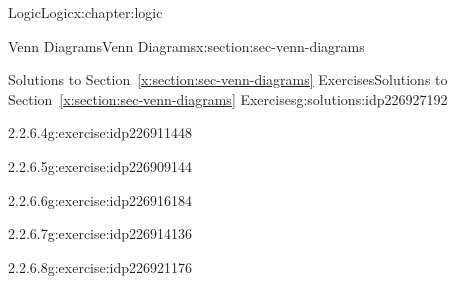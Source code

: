 \documentclass[twoside,10pt,]{book}
\newcommand{\xreffont}{\relax}
\numberwithin{equation}{section}
\begin{document}
\begin{chapterptx}{Logic}{}{Logic}{}{}{x:chapter:logic}
\begin{sectionptx}{Venn Diagrams}{}{Venn Diagrams}{}{}{x:section:sec-venn-diagrams}
\begin{solutions-subsection}{Solutions to Section~{\xreffont\ref*{x:section:sec-venn-diagrams}} Exercises}{}{Solutions to Section~{\xreffont\ref*{x:section:sec-venn-diagrams}} Exercises}{}{}{g:solutions:idp226927192}
\begin{exercisegroup}
\begin{divisionsolutioneg}{2.2.6.4}{}{g:exercise:idp226911448}
\begin{image}{0.3}{0.4}{0.3}
\resizebox{\linewidth}{!}{%
\begin{venndiagram2sets}[labelA={$p$},labelB={$q$}]
  \fillNotA
  \fillB
\end{venndiagram2sets}
}%
\end{image}%
\end{divisionsolutioneg}%
\begin{divisionsolutioneg}{2.2.6.5}{}{g:exercise:idp226909144}%
\par\smallskip%
\noindent\hypertarget{g:solution:idp226909784-main}{}\begin{image}{0.3}{0.4}{0.3}%
\resizebox{\linewidth}{!}{%
\begin{venndiagram2sets}[labelA={$p$},labelB={$q$}]
  \fillNotAorB
\end{venndiagram2sets}
}%
\end{image}%
\end{divisionsolutioneg}%
\begin{divisionsolutioneg}{2.2.6.6}{}{g:exercise:idp226916184}%
\par\smallskip%
\noindent\hypertarget{g:solution:idp226913624-main}{}\begin{image}{0.3}{0.4}{0.3}%
\resizebox{\linewidth}{!}{%
\begin{venndiagram2sets}[labelA={$p$},labelB={$q$}]
  \fillACapB
\end{venndiagram2sets}
}%
\end{image}%
\end{divisionsolutioneg}%
\begin{divisionsolutioneg}{2.2.6.7}{}{g:exercise:idp226914136}%
\par\smallskip%
\noindent\hypertarget{g:solution:idp226914520-main}{}\begin{image}{0.3}{0.4}{0.3}%
\resizebox{\linewidth}{!}{%
\begin{venndiagram2sets}[labelA={$p$},labelB={$q$}]
  \fillA
\end{venndiagram2sets}
}%
\end{image}%
\end{divisionsolutioneg}%
\end{exercisegroup}
\par\medskip\noindent
\begin{exercisegroup}
\begin{divisionsolutioneg}{2.2.6.8}{}{g:exercise:idp226921176}%
\par\smallskip%
\noindent\hypertarget{g:solution:idp226917720-main}{}\begin{image}{0.3}{0.4}{0.3}%
\resizebox{\linewidth}{!}{%
}
\end{image}
\end{divisionsolutioneg}
\end{exercisegroup}
\end{solutions-subsection}
\end{sectionptx}
\end{chapterptx}
\end{document}
